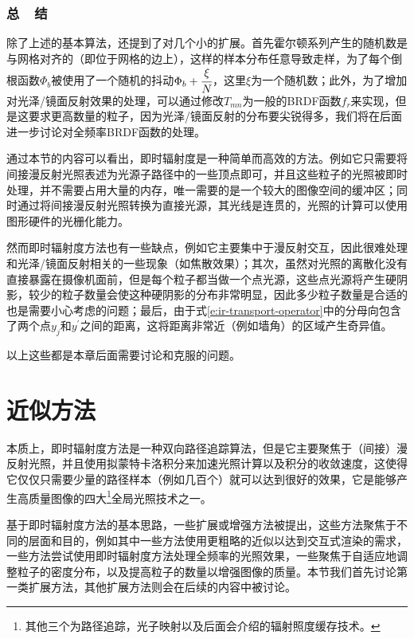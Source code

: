 



\subsubsection{总~~结}
除了上述的基本算法，\cite{a:InstantRadiosity}还提到了对几个小的扩展。首先霍尔顿系列产生的随机数是与网格对齐的（即位于网格的边上），这样的样本分布任意导致走样，为了每个倒根函数$\Phi_b$被使用了一个随机的抖动$\Phi_b+ \cfrac{\xi}{N}$，这里$\xi$为一个随机数；此外，为了增加对光泽/镜面反射效果的处理，可以通过修改$T_{mn}$为一般的BRDF函数$f_r$来实现，但是这要求更高数量的粒子，因为光泽/镜面反射的分布要尖锐得多，我们将在后面进一步讨论对全频率BRDF函数的处理。

通过本节的内容可以看出，即时辐射度是一种简单而高效的方法。例如它只需要将间接漫反射光照表述为光源子路径中的一些顶点即可，并且这些粒子的光照被即时处理，并不需要占用大量的内存，唯一需要的是一个较大的图像空间的缓冲区；同时通过将间接漫反射光照转换为直接光源，其光线是连贯的，光照的计算可以使用图形硬件的光栅化能力。

然而即时辐射度方法也有一些缺点，例如它主要集中于漫反射交互，因此很难处理和光泽/镜面反射相关的一些现象（如焦散效果）；其次，虽然对光照的离散化没有直接暴露在摄像机面前，但是每个粒子都当做一个点光源，这些点光源将产生硬阴影，较少的粒子数量会使这种硬阴影的分布非常明显，因此多少粒子数量是合适的也是需要小心考虑的问题；最后，由于式\ref{e:ir-transport-operator}中的分母向包含了两个点$y_j$和$y^{'}$之间的距离，这将距离非常近（例如墙角）的区域产生奇异值。

以上这些都是本章后面需要讨论和克服的问题。





\section{近似方法}\label{sec:ir-improved-algorithms}
本质上，即时辐射度方法是一种双向路径追踪算法，但是它主要聚焦于（间接）漫反射光照，并且使用拟蒙特卡洛积分来加速光照计算以及积分的收敛速度，这使得它仅仅只需要少量的路径样本（例如几百个）就可以达到很好的效果，它是能够产生高质量图像的四大\footnote{其他三个为路径追踪，光子映射以及后面会介绍的辐射照度缓存技术。}全局光照技术之一。

基于即时辐射度方法的基本思路，一些扩展或增强方法被提出，这些方法聚焦于不同的层面和目的，例如其中一些方法使用更粗略的近似以达到交互式渲染的需求，一些方法尝试使用即时辐射度方法处理全频率的光照效果，一些聚焦于自适应地调整粒子的密度分布，以及提高粒子的数量以增强图像的质量。本节我们首先讨论第一类扩展方法，其他扩展方法则会在后续的内容中被讨论。




